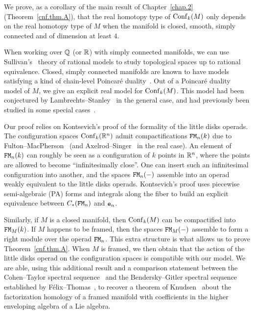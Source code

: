 We prove, as a corollary of the main result of Chapter~\ref{chap.2} (Theorem~\ref{cnf.thm.A}), that the real homotopy type of $\operatorname{Conf}_{k}(M)$ only depends on the real homotopy type of $M$ when the manifold is closed, smooth, simply connected and of dimension at least $4$.

When working over $\mathbb{Q}$ (or $\mathbb{R}$) with simply connected manifolds, we can use Sullivan's~\cite{Sullivan1977} theory of rational models to study topological spaces up to rational equivalence.
Closed, simply connected manifolds are known to have models satisfying a kind of chain-level Poincaré duality~\cite{LambrechtsStanley2008}.
Out of a Poincaré duality model of $M$, we give an explicit real model for $\operatorname{Conf}_{k}(M)$.
This model had been conjectured by Lambrechts--Stanley~\cite{LambrechtsStanley2008a} in the general case, and had previously been studied in some special cases~\cite{CohenTaylor1978,BenderskyGitler1991,Kriz1994,Totaro1996,FelixThomas2004,LambrechtsStanley2004,CordovaBulens2015}.

Our proof relies on Kontsevich's proof of the formality of the little disks operads.
The configuration spaces $\operatorname{Conf}_{k}(\mathbb{R}^{n})$ admit compactifications $\mathtt{FM}_{n}(k)$ due to Fulton--MacPherson~\cite{FultonMacPherson1994} (and Axelrod--Singer~\cite{AxelrodSinger1994} in the real case).
An element of $\mathtt{FM}_{n}(k)$ can roughly be seen as a configuration of $k$ points in $\mathbb{R}^{n}$, where the points are allowed to become ``infinitesimally close''.
One can insert such an infinitesimal configuration into another, and the spaces $\mathtt{FM}_{n}(-)$ assemble into an operad weakly equivalent to the little disks operads.
Kontsevich's proof uses piecewise semi-algebraic (PA) forms and integrals along the fiber to build an explicit equivalence between $C_{*}(\mathtt{FM}_{n})$ and $\mathtt{e}_{n}$.

Similarly, if $M$ is a closed manifold, then $\operatorname{Conf}_{k}(M)$ can be compactified into $\mathtt{FM}_{M}(k)$.
If $M$ happens to be framed, then the spaces $\mathtt{FM}_{M}(-)$ assemble to form a right module over the operad $\mathtt{FM}_{n}$.
This extra structure is what allows us to prove Theorem~\ref{cnf.thm.A}.
When $M$ is framed, we then obtain that the action of the little disks operad on the configuration spaces is compatible with our model.
We are able, using this additional result and a comparison statement between the Cohen--Taylor spectral sequence~\cite{CohenTaylor1978} and the Bendersky--Gitler spectral sequence~\cite{BenderskyGitler1991} established by Félix--Thomas~\cite{FelixThomas2004}, to recover a theorem of Knudsen~\cite{Knudsen2016} about the factorization homology of a framed manifold with coefficients in the higher enveloping algebra of a Lie algebra.


